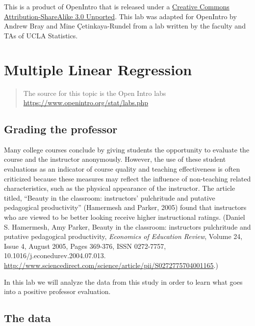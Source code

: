 \documentclass[]{book}
\theoremstyle{definition}
\theoremstyle{definition}
\theoremstyle{remark}
\begin{document}
\hypertarget{license}{}
This is a product of OpenIntro that is released under a
\href{http://creativecommons.org/licenses/by-sa/3.0}{Creative Commons
Attribution-ShareAlike 3.0 Unported}. This lab was adapted for OpenIntro
by Andrew Bray and Mine Çetinkaya-Rundel from a lab written by the
faculty and TAs of UCLA Statistics.

\hypertarget{multiple-regression}{\chapter*{Multiple Linear
Regression}\label{multiple-regression}}

\begin{quote}
The source for this topic is the Open Intro labs
\url{https://www.openintro.org/stat/labs.php}
\end{quote}

\section*{Grading the professor}\label{grading-the-professor}

Many college courses conclude by giving students the opportunity to
evaluate the course and the instructor anonymously. However, the use of
these student evaluations as an indicator of course quality and teaching
effectiveness is often criticized because these measures may reflect the
influence of non-teaching related characteristics, such as the physical
appearance of the instructor. The article titled, ``Beauty in the
classroom: instructors' pulchritude and putative pedagogical
productivity'' (Hamermesh and Parker, 2005) found that instructors who
are viewed to be better looking receive higher instructional ratings.
(Daniel S. Hamermesh, Amy Parker, Beauty in the classroom: instructors
pulchritude and putative pedagogical productivity, \emph{Economics of
Education Review}, Volume 24, Issue 4, August 2005, Pages 369-376, ISSN
0272-7757, 10.1016/j.econedurev.2004.07.013.
\url{http://www.sciencedirect.com/science/article/pii/S0272775704001165}.)

In this lab we will analyze the data from this study in order to learn
what goes into a positive professor evaluation.

\section*{The data}\label{the-data-5}
\end{document}
